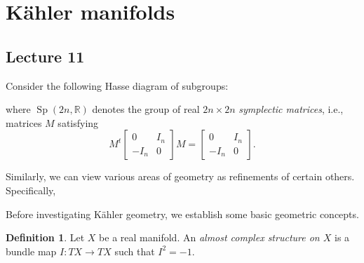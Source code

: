 \documentclass[10pt,letterpaper,cm]{nupset}
\theoremstyle{definition}
\newtheorem{defn}{Definition}[subsection]
\theoremstyle{theorem}
\theoremstyle{remark}
\newcommand{\C}{\mathbb C}
\newcommand{\R}{\mathbb{R}}
\newcommand{\1}{\mathbb{1}}
\newcommand{\0}{\vec 0}
\DeclareMathOperator{\Sp}{Sp}
\DeclareMathOperator{\GL}{GL}
\DeclareMathOperator{\SO}{SO}
\DeclareMathOperator{\U}{U}
\begin{document}
\section{K\"ahler manifolds}

\subsection{Lecture 11}

Consider the following Hasse diagram of subgroups:

\begin{center}
\end{center}

where $\Sp\left(2n, \R\right)$ denotes the group of real $2n\times 2n$ \textit{symplectic matrices}, i.e., matrices $M$ satisfying $$M^t{\begin{bmatrix} 0 & I_n \\ {-I_n} & 0 \end{bmatrix}}{M} = \begin{bmatrix} 0 & I_n \\ {-I_n} & 0 \end{bmatrix}.$$

Similarly, we can view various areas of geometry as refinements of certain others. Specifically,

\begin{center}
\end{center}

Before investigating K\"ahler geometry, we establish some basic geometric concepts.

\begin{defn}
Let  $X$ be a real manifold. An \textit{almost complex structure on $X$} is a bundle map $I : T{X} \to T{X}$ such that $I^2 = {-1}$.
\end{defn}
\end{document}
